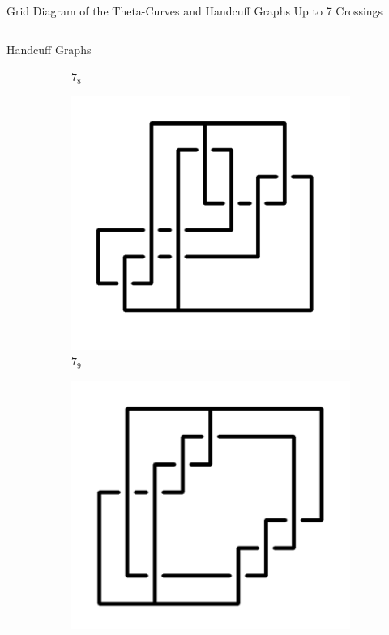 \documentclass[final]{beamer}
\begin{document}
\begin{frame}[t]
\begin{alertblock}{Grid Diagram of the Theta-Curves and Handcuff Graphs Up to 7 Crossings}
\begin{columns}[t]
\begin{column}{0.5\textwidth}
\begin{alertblock}{Handcuff Graphs}
\begin{figure}
\begin{subfigure}{0.075\textwidth}
    \caption{$7_{8}$} 
    \end{subfigure}
    \begin{subfigure}{0.075\textwidth}
    \includegraphics[width=\columnwidth]{../Midterm_Poster/grid_diagram/handcuff_7_9.png}
    \caption{$7_{9}$} 
    \end{subfigure}
    \begin{subfigure}{0.075\textwidth}
    \includegraphics[width=\columnwidth]{../Midterm_Poster/grid_diagram/handcuff_7_10.png}

\end{subfigure}
\end{figure}
\end{alertblock}
\end{column}
\end{columns}
\end{alertblock}
\end{frame}
\end{document}
